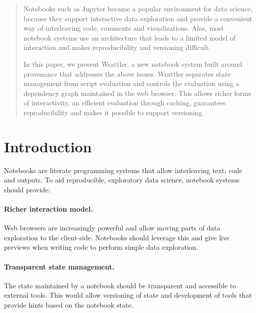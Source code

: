 \documentclass[sigplan]{acmart}\settopmatter{printfolios=true,printccs=false,printacmref=false}
\begin{document}
\begin{abstract}
Notebooks such as Jupyter became a popular environment for data science, because 
they support interactive data exploration and provide a convenient way of interleaving code, 
comments and visualizations. Alas, most notebook systems use an architecture that leads to a 
limited model of interaction and makes reproducibility and versioning difficult.

In this paper, we present Wrattler, a new notebook system built around provenance that addresses
the above issues. Wrattler separates state management from script evaluation and controls the 
evaluation using a dependency graph maintained in the web browser. This allows richer forms of 
interactivity, an efficient evaluation through caching, guarantees reproducibility and makes it 
possible to support versioning.
\end{abstract}
\maketitle

\section{Introduction}
Notebooks \cite{ipython,jupyter} are literate programming \cite{literate} systems
that allow interleaving text, code and outputs. To aid reproducible, 
exploratory data science, notebook systems should provide:

\vspace{-0.3em}
\paragraph{Richer interaction model.}
Web browsers are increasingly powerful and allow moving parts of data exploration to the client-side. 
Notebooks should leverage this and give live previews when writing code to perform simple data exploration.

\vspace{-0.3em}
\paragraph{Transparent state management.}
The state maintained by a notebook should be transparent and accessible to external tools. This
would allow versioning of state and development of tools that provide hints based on the notebook state.
\end{document}
